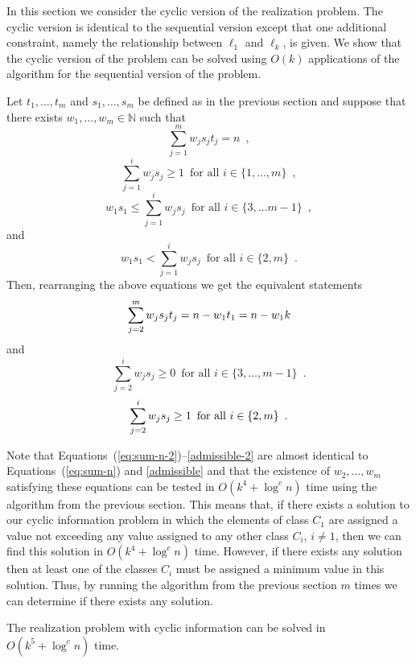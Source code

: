\documentclass[11pt,a4paper]{article}
\newcommand{\N}{\mathbb{N}}
\begin{document}
In this section we consider the cyclic version of the realization
problem.  The cyclic version is identical to the sequential version
except that one additional constraint, namely the relationship between
$\ell_1$ and $\ell_k$, is given.  We show that the cyclic version of
the problem can be solved using $O(k)$ applications of the algorithm
for the sequential version of the problem.  

Let $t_1,\ldots,t_m$ and $s_1,\ldots,s_m$ be defined as in the
previous section and suppose that there exists $w_1,\ldots,w_m\in\N$ such
that
\[
   \sum_{j=1}^m w_js_jt_j = n \enspace ,
\]
\[
  \sum_{j=1}^i w_js_j \ge 1 \enspace \mbox{for all $i\in \{1,\ldots,m\}$}
   \enspace ,
\]
\[
  w_1s_1 \le \sum_{j=1}^i w_js_j
     \enspace\mbox{for all $i\in\{ 3,\ldots m-1\}$}
     \enspace ,
\] 
and
\[
  w_1s_1 < \sum_{j=1}^i w_js_j
     \enspace\mbox{for all $i\in\{ 2,m\}$}
     \enspace .
\]
Then, rearranging the above equations we get the equivalent statements
\begin{equation}
\sum_{j=2}^m w_js_jt_j = n - w_1t_1 = n-w_1k  \eqlabel{sum-n-2}
\end{equation}
and
\begin{equation}
   \sum_{j=2}^i w_js_j \ge 0
       \enspace\mbox{for all $i\in\{3,\ldots,m-1\}$}
       \enspace .  
\end{equation}
\begin{equation}
   \sum_{j=2}^i w_js_j \ge 1
       \enspace\mbox{for all $i\in\{2,m\}$}
       \enspace .  \eqlabel{admissible-2}
\end{equation}

Note that Equations~(\ref{eq:sum-n-2})--\eqref{admissible-2} are
almost identical to Equations~(\ref{eq:sum-n}) and \eqref{admissible}
and that the existence of $w_2,\ldots,w_m$ satisfying these equations
can be tested in $O(k^4+\log^c n)$ time using the algorithm from the
previous section.  This means that, if there exists a solution to our
cyclic information problem in which the elements of class $C_1$ are
assigned a value not exceeding any value assigned to any other class
$C_i$, $i\neq 1$, then we can find this solution in $O(k^4+\log^c n)$
time.  However, if there exists any solution then at least one of the
classes $C_i$ must be assigned a minimum value in this solution.
Thus, by running the algorithm from the previous section $m$ times we
can determine if there exists any solution.

\begin{thm}
The realization problem with cyclic information can be solved in
$O(k^5+\log^c n)$ time.
\end{thm}
\end{document}
